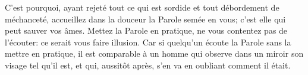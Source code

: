 C’est pourquoi, ayant rejeté tout ce qui est sordide et tout débordement de méchanceté,
	accueillez dans la douceur la Parole semée en vous;
	c’est elle qui peut sauver vos âmes.
Mettez la Parole en pratique, ne vous contentez pas de l’écouter:
	ce serait vous faire illusion.
Car si quelqu’un écoute la Parole sans la mettre en pratique,
	il est comparable à un homme qui observe dans un miroir son visage tel qu’il est,
	et qui, aussitôt après, s’en va en oubliant comment il était.
